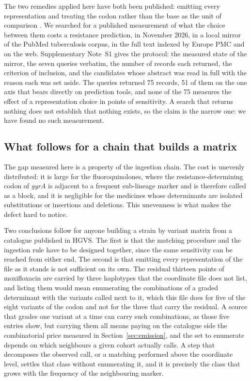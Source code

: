 \documentclass[11pt]{article}
\begin{document}
The two remedies applied here have both been published: emitting every representation
\cite{verboven2022} and treating the codon rather than the base as the unit of comparison
\cite{srinivasan2021,wang2020}. We searched for a published measurement of what the choice
between them costs a resistance prediction, in November 2026, in a local mirror of the
PubMed tuberculosis corpus, in the full text indexed by Europe PMC and on the web.
Supplementary Note~S1 gives the protocol: the measured state of the mirror, the seven queries
verbatim, the number of records each returned, the criterion of inclusion, and the candidates
whose abstract was read in full with the reason each was set aside. The queries returned 75
records, 51 of them on the one axis that bears directly on prediction tools, and none of the
75 measures the effect of a representation choice in points of sensitivity. A search that
returns nothing does not establish that nothing exists, so the claim is the narrow one: we
have found no such measurement.

\subsection{What follows for a chain that builds a matrix}
The gap measured here is a property of the ingestion chain. The cost is unevenly distributed: it is
large for the fluoroquinolones, where the resistance-determining codon of \textit{gyrA} is
adjacent to a frequent sub-lineage marker and is therefore called as a block, and it is
negligible for the medicines whose determinants are isolated substitutions or insertions and
deletions. This unevenness is what makes the defect hard to notice.

Two conclusions follow for anyone building a strain by variant matrix from a catalogue
published in HGVS. The first is that the matching procedure and the ingestion rule have to
be designed together, since the same sensitivity can be reached from either end. The second is that emitting every representation of the file as it stands is not
sufficient on its own. The residual thirteen points of moxifloxacin are carried by three
haplotypes that the coordinate file does not list, and listing them would mean enumerating
the combinations of a graded determinant with the variants called next to it, which this
file does for five of the eight variants of the codon and not for the three that carry the
residual. A source that grades one variant at a time can carry such combinations, as those
five entries show, but
carrying them all means paying on the catalogue side the combinatorial price measured in
Section~\ref{sec:emission}, and the set to enumerate depends on which neighbours a given
cohort actually calls. A step that decomposes the observed call, or a matching performed
above the coordinate level, settles that class without enumerating it, and it is precisely
the class that grows with the frequency of the neighbouring marker.
\end{document}
